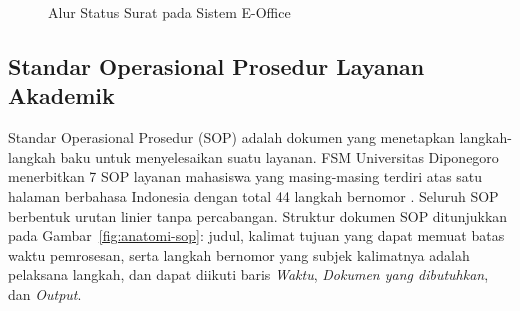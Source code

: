 \begin{figure}[htbp]
\centering
{}
\caption{Alur Status Surat pada Sistem E-Office}
\label{fig:eoffice-status}
\end{figure}

\subsection{Standar Operasional Prosedur Layanan Akademik}
\label{sec:sop}
Standar Operasional Prosedur (SOP) adalah dokumen yang menetapkan langkah-langkah baku untuk menyelesaikan suatu layanan. FSM Universitas Diponegoro menerbitkan 7 SOP layanan mahasiswa yang masing-masing terdiri atas satu halaman berbahasa Indonesia dengan total 44 langkah bernomor \parencite{wiratama2026procedure}. Seluruh SOP berbentuk urutan linier tanpa percabangan. Struktur dokumen SOP ditunjukkan pada Gambar~\ref{fig:anatomi-sop}: judul, kalimat tujuan yang dapat memuat batas waktu pemrosesan, serta langkah bernomor yang subjek kalimatnya adalah pelaksana langkah, dan dapat diikuti baris \textit{Waktu}, \textit{Dokumen yang dibutuhkan}, dan \textit{Output}.

